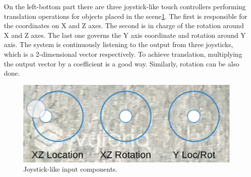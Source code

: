 \documentclass[11pt]{article}
\begin{document}
	On the left-bottom part there are three joystick-like touch controllers performing translation operations for objects placed in the scene\ref{fig:joy}. The first is responsible for the coordinates on X and Z axes. The second is in charge of the rotation around X and Z axes. The last one governs the Y axis coordinate and rotation around Y axis. The system is continuously listening to the output from three joysticks, which is a 2-dimensional vector respectively. To achieve translation, multiplying the output vector by a coefficient is a good way. Similarly, rotation can be also done.
	\begin{figure}[htbp]
		\centering
		\includegraphics[width=.80\textwidth]{fig/joystick.png}
		\caption{Joystick-like input components.}
		\label{fig:joy}
	\end{figure}
	
\end{document}
